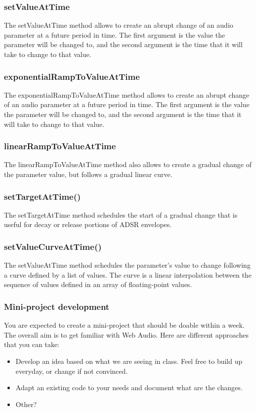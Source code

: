 \documentclass[screen, aspectratio=43]{beamer}
\begin{document}
%
\begin{frame}
\frametitle{setValueAtTime}
The \textrm{setValueAtTime} method allows to create an abrupt change of an audio parameter at a future period in time.  The first argument is the value the parameter will be changed to, and the second argument is the time that it will take to change to that value.
\end{frame}
%
\begin{frame}
\frametitle{exponentialRampToValueAtTime }
The \textrm{exponentialRampToValueAtTime} method allows to create an abrupt change of an audio parameter at a future period in time.  The first argument is the value the parameter will be changed to, and the second argument is the time that it will take to change to that value.
\end{frame}
%
\begin{frame}
\frametitle{linearRampToValueAtTime}
The \textrm{linearRampToValueAtTime} method also allows to create a gradual change of the parameter value, but follows a gradual linear curve.
\end{frame}
%
\begin{frame}
\frametitle{setTargetAtTime()}
The \textrm{setTargetAtTime} method schedules the start of a gradual change that is useful for decay or release portions of ADSR envelopes.
\end{frame}
%
\begin{frame}
\frametitle{setValueCurveAtTime()}
The \textrm{setValueAtTime} method schedules the parameter's value to change following a curve defined by a list of values. The curve is a linear interpolation between the sequence of values defined in an array of floating-point values.
\end{frame}
%	
\begin{frame}
\frametitle{Mini-project development}
You are expected to create a mini-project that should be doable within a week. The overall aim is to get familiar with Web Audio. Here are different approaches that you can take:
\begin{itemize}
\item Develop an idea based on what we are seeing in class. Feel free to build up everyday, or change if not convinced.
\item Adapt an existing code to your needs and document what are the changes.
\item Other?
\end{itemize}
\end{frame}
\end{document}

